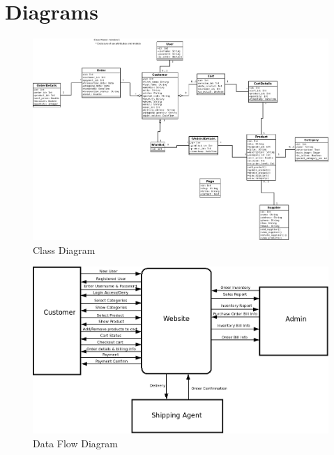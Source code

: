 \documentclass{report}
\begin{document}
\chapter{Diagrams}
\begin{figure}[h!]
\includegraphics[width=\linewidth]{Diagrams/ClassDiagram.png}
\caption{Class Diagram}
\label{fig:ClassDiagram}
\end{figure}

\begin{figure}[h!]
\includegraphics[width=\linewidth]{Diagrams/DataFlowDiagram.png}
\caption{Data Flow Diagram}
\label{fig:DataFlow}
\end{figure}
\end{document}
